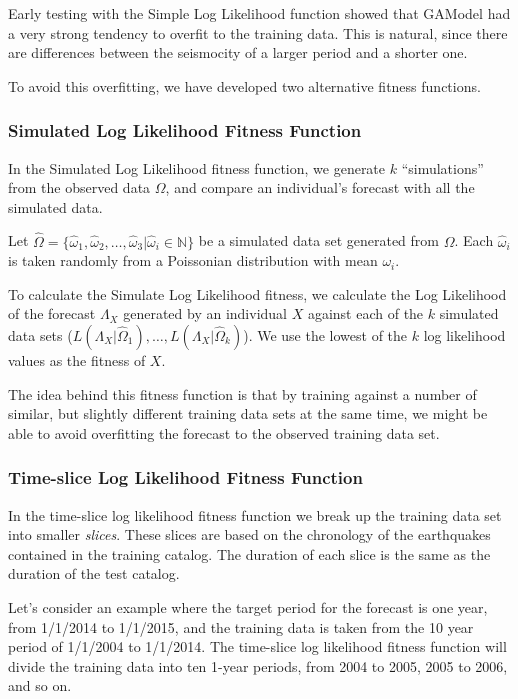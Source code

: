 \documentclass{sig-alternate}
\begin{document}
Early testing with the Simple Log Likelihood function showed that
GAModel had a very strong tendency to overfit to the training
data. This is natural, since there are differences between the
seismocity of a larger period and a shorter one. 

To avoid this overfitting, we have developed two alternative fitness
functions.

\subsubsection{Simulated Log Likelihood Fitness Function}

In the Simulated Log Likelihood fitness function, we generate $k$
``simulations'' from the observed data $\Omega$, and compare an
individual's forecast with all the simulated data.

Let $\hat\Omega =
\{\hat\omega_1,\hat\omega_2,\dots,\hat\omega_3
|\hat\omega_i\in\mathbb{N}\}$ be a simulated data set generated from
$\Omega$. Each $\hat\omega_i$ is taken randomly from a Poissonian
distribution with mean $\omega_i$.

To calculate the Simulate Log Likelihood fitness, we calculate the Log
Likelihood of the forecast $\Lambda_X$ generated by an individual $X$
against each of the $k$ simulated data sets
($L(\Lambda_X|\hat\Omega_1), \dots, L(\Lambda_X|\hat\Omega_k)$). We
use the lowest of the $k$ log likelihood values as the fitness of $X$.

The idea behind this fitness function is that by training against a
number of similar, but slightly different training data sets at the
same time, we might be able to avoid overfitting the forecast to the
observed training data set.

\subsubsection{Time-slice Log Likelihood Fitness Function}

In the time-slice log likelihood fitness function we break up the
training data set into smaller \emph{slices}. These slices are based
on the chronology of the earthquakes contained in the training
catalog. The duration of each slice is the same as the duration of the
test catalog.

Let's consider an example where the target period for the forecast is
one year, from 1/1/2014 to 1/1/2015, and the training data is taken
from the 10 year period of 1/1/2004 to 1/1/2014. The time-slice log
likelihood fitness function will divide the training data into ten
1-year periods, from 2004 to 2005, 2005 to 2006, and so on. 
\end{document}
